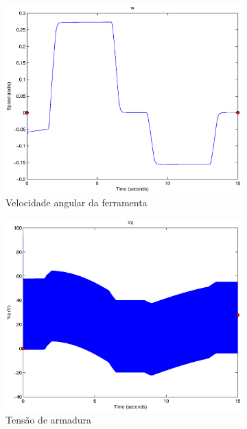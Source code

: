 \documentclass{article}
\begin{document}
\begin{figure}[H]
\begin{subfigure}{0.32\textwidth}
		\includegraphics[width=\linewidth]{matlab/w5}
		\caption{Velocidade angular da ferramenta}
	\end{subfigure}
	\begin{subfigure}{0.32\textwidth}
		\includegraphics[width=\linewidth]{matlab/va5}
		\caption{Tensão de armadura}
	\end{subfigure}
	\begin{subfigure}{0.32\textwidth}

\end{subfigure}
\end{figure}
\end{document}
